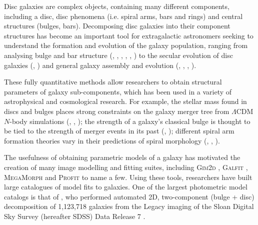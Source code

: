 \documentclass[../main.tex]{subfiles}
\begin{document}
\label{sec:introduction}

Disc galaxies are complex objects, containing many different components, including a disc, disc phenomena (i.e. spiral arms, bars and rings) and central structures (bulges, bars). Decomposing disc galaxies into their component structures has become an important tool for extragalactic astronomers seeking to understand the formation and evolution of the galaxy population, ranging from analysing bulge and bar structure (\citealt{1985ApJ...288..438E}, \citealt{1996A&AS..118..557D}, \citealt{2011MNRAS.415.3308G}, \citealt{Mendez-Abreu2016:1610.05324v1}, \citealt{Gao2017:1709.00746v1}, \citealt{2018MNRAS.473.4731K}) to the secular evolution of disc galaxies (\citealt{1998ApJ...500...75L}, \citealt{2005ApJ...635..959B}) and general galaxy assembly and evolution (\citealt{Simard2002:astro-ph/0205025v2}, \citealt{megamorph-paper}, \citealt{2012MNRAS.421.2277L}, \citealt{2019arXiv191002664R}).

These fully quantitative methods allow researchers to obtain structural parameters of galaxy sub-components, which has been used in a variety of astrophysical and cosmological research. For example, the stellar mass found in discs and bulges places strong constraints on the galaxy merger tree from $\Lambda$CDM $N$-body simulations (\citealt{2009MNRAS.396.1972P}, \citealt{Hopkins2010:1004.2708v3}, \citealt{2018MNRAS.475.5133R}); the strength of a galaxy's classical bulge is thought to be tied to the strength of merger events in its past (\citealt{2005ApJ...622L...9S}, \citealt{Kormendy2010:1009.3015v1}); different spiral arm formation theories vary in their predictions of spiral morphology (\citealt{Dobbs2014:1407.5062v1}, \citealt{Pour-Imani2016:1608.00969v1}, \citealt{2017MNRAS.472.2263H}).

The usefulness of obtaining parametric models of a galaxy has motivated the creation of many image modelling and fitting suites, including \textsc{Gim2d} \citep{gim2d-paper}, \textsc{Galfit} \citep{galfit-paper}, \textsc{MegaMorph} \citep{megamorph-paper} and \textsc{Profit} \citep{profit-paper} to name a few. Using these tools, researchers have built large catalogues of model fits to galaxies. One of the largest photometric model catalogs is that of \citet{2011ApJS..196...11S}, who performed automated 2D, two-component (bulge + disc) decomposition of 1,123,718 galaxies from the Legacy imaging of the Sloan Digital Sky Survey (hereafter SDSS) Data Release 7 \citep{SDSSDR7}.
\end{document}
